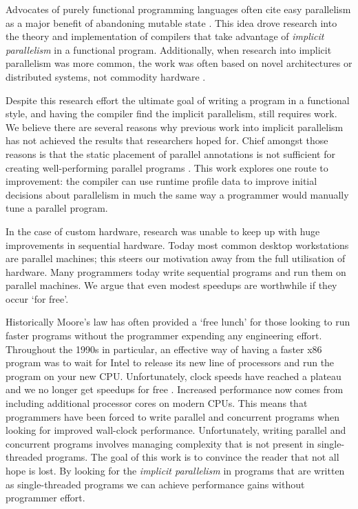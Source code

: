 Advocates of purely functional programming languages often cite easy
parallelism as a major benefit of abandoning mutable state
\citep{hughes:thesis, SPJ:PIFPL}. This idea drove research into the theory and
implementation of compilers that take advantage of \emph{implicit parallelism}
in a functional program. Additionally, when research into implicit parallelism
was more common, the work was often based on novel architectures or distributed
systems, not commodity hardware \citep{GRIP, hammond2000research}. 

Despite this research effort the ultimate goal of writing a program in a
functional style, and having the compiler find the implicit parallelism, still
requires work.  We believe there are several reasons why previous work into
implicit parallelism has not achieved the results that researchers hoped for.
Chief amongst those reasons is that the static placement of parallel
annotations is not sufficient for creating well-performing parallel programs
\citep{hammond2000research, hogen1992automatic, tremblay1995impact,
feedbackImplicit}. This work explores one route to improvement: the compiler
can use runtime profile data to improve initial decisions about parallelism in
much the same way a programmer would manually tune a parallel program.

In the case of custom hardware, research was unable to keep up with huge
improvements in sequential hardware. Today most common desktop workstations are
parallel machines; this steers our motivation away from the full utilisation of
hardware. Many programmers today write sequential programs and run them on
parallel machines. We argue that even modest speedups are worthwhile if they
occur `for free'.

Historically Moore's law has often provided a `free lunch' for those looking to
run faster programs without the programmer expending any engineering effort.
Throughout the 1990s in particular, an effective way of having a faster x86
program was to wait for Intel\texttrademark{} to release its new line of
processors and run the program on your new CPU. Unfortunately, clock speeds
have reached a plateau and we no longer get speedups for free
\citep{sutter2005free}. Increased performance now comes from including
additional processor cores on modern CPUs.  This means that programmers have
been forced to write parallel and concurrent programs when looking for improved
wall-clock performance. Unfortunately, writing parallel and concurrent programs
involves managing complexity that is not present in single-threaded programs.
The goal of this work is to convince the reader that not all hope is lost. By
looking for the \emph{implicit parallelism} in programs that are written as
single-threaded programs we can achieve performance gains without programmer
effort.

